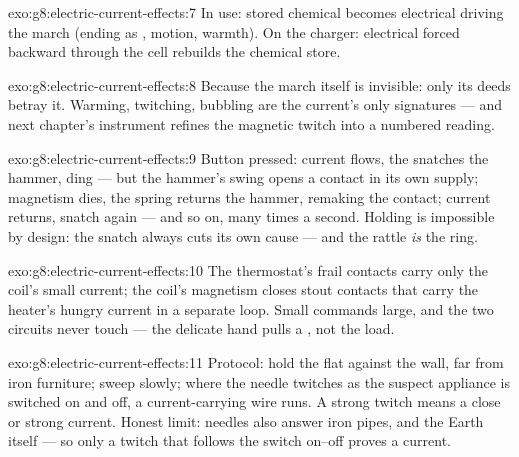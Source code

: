 \begin{solution}{exo:g8:electric-current-effects:7}
In use: stored chemical  becomes electrical  driving
the march (ending as , motion, warmth). On the charger:
electrical  forced backward through the cell rebuilds the
chemical store.
\end{solution}

\begin{solution}{exo:g8:electric-current-effects:8}
Because the march itself is invisible: only its deeds betray it.
Warming, twitching, bubbling are the current's only signatures
--- and next chapter's instrument refines the magnetic twitch
into a numbered reading.
\end{solution}

\begin{solution}{exo:g8:electric-current-effects:9}
Button pressed: current flows, the  snatches the
hammer, ding --- but the hammer's swing opens a contact in its
own supply; magnetism dies, the spring returns the hammer,
remaking the contact; current returns, snatch again --- and so
on, many times a second. Holding is impossible by design: the
snatch always cuts its own cause --- and the rattle \emph{is}
the ring.
\end{solution}

\begin{solution}{exo:g8:electric-current-effects:10}
The thermostat's frail contacts carry only the coil's small
current; the coil's magnetism closes stout contacts that carry
the heater's hungry current in a separate loop. Small commands
large, and the two circuits never touch --- the delicate hand
pulls a , not the load.
\end{solution}

\begin{solution}{exo:g8:electric-current-effects:11}
Protocol: hold the  flat against the wall, far from iron
furniture; sweep slowly; where the needle twitches as the
suspect appliance is switched on and off, a current-carrying
wire runs. A strong twitch means a close or strong current.
Honest limit: needles also answer iron pipes,  and the
Earth itself --- so only a twitch that follows the switch
on--off proves a current.
\end{solution}


